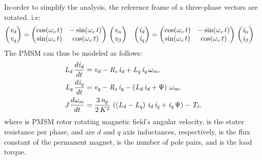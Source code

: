 In-order to simplify the analysis, the reference frame of a three-phase vectors are rotated. i.e:
\begin{align*}
	\begin{pmatrix}
			\vd \\
			\vq
	\end{pmatrix} &= \begin{pmatrix}
						\cos(\we\,t) & -\sin(\we\,t) \\
						\sin(\we\,t) & \cos(\we\,t) \\
					 \end{pmatrix}\, \begin{pmatrix}
										 \valpha \\
										 \vbeta
									 \end{pmatrix} & \begin{pmatrix}
									 \id \\
									 \iq
								 \end{pmatrix} &= \begin{pmatrix}
								 \cos(\we\,t) & -\sin(\we\,t) \\
								 \sin(\we\,t) & \cos(\we\,t) \\
							 \end{pmatrix}\, \begin{pmatrix}
							 \ialpha \\
							 \ibeta
						 \end{pmatrix}
\end{align*}
The PMSM can thus be modeled as follows:
\begin{align*}
	\Ld\,\frac{d\id}{dt} &= \vd - \Rs\,\id + \Lq\,\iq\,\wm,\\
	\Lq\,\frac{d\iq}{dt} &= \vq - \Rs\,\iq - \left(\Ld\,\id + \flux\right)\,\wm,\\
	\J\,\frac{d\wm}{dt} &= \frac{3\,\np}{2\,K^2}\,\left(\left(\Ld - \Lq\right)\,\id\,\iq + \iq\,\flux\right) - \Tl,
\end{align*}
where \wm is PMSM rotor rotating magnetic field's angular velocity, \Rs is the stater resistance per phase, \Ld and \Lq are $d$ and $q$ axis inductances, respectively, \flux is the flux constant of the permanent magnet, \np is the number of pole pairs, and \Tl is the load torque. 

